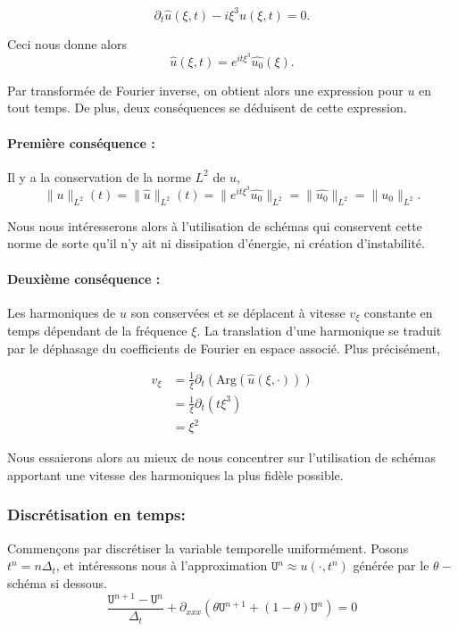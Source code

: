 \documentclass[12pt,a4paper]{article}
\numberwithin{equation}{section}
\begin{document}
\begin{equation*}
    \partial_t\hat{u}(\xi, t) - i\xi^3\hat{u}(\xi, t) = 0.
\end{equation*}

Ceci nous donne alors
\begin{equation*}
    \hat{u}(\xi, t) = e^{it\xi^3}\hat{u_0}(\xi).
\end{equation*}

Par transformée de Fourier inverse, on obtient alors une expression pour $u$ en tout temps. De plus, deux conséquences se déduisent de cette expression.
\paragraph{Première conséquence :} Il y a la conservation de la norme $L^2$ de $u$,
\begin{equation}
    \|u\|_{L^2}(t) = \|\hat{u}\|_{L^2}(t) =\|e^{it\xi^3}\hat{u_0}\|_{L^2} =  \|\hat{u_0}\|_{L^2} =  \|u_0\|_{L^2} .
\end{equation}

Nous nous intéresserons alors à l'utilisation de schémas qui conservent cette norme de sorte qu'il n'y ait ni dissipation d'énergie, ni création d'instabilité.

\paragraph{Deuxième conséquence :} Les harmoniques de $u$ son conservées et se déplacent à vitesse $v_\xi$ constante en temps dépendant de la fréquence $\xi$. La translation d'une harmonique se traduit par le déphasage du coefficients de Fourier en espace associé. Plus précisément, 

\begin{equation}
\begin{split}
    v_\xi &= \frac{1}{\xi}\partial_t (\text{Arg}(\hat{u}(\xi,\cdot)))
    \\ &= \frac{1}{\xi}\partial_t (t\xi^3) 
    \\ &= \xi^2
\end{split}
\end{equation}

Nous essaierons alors au mieux de nous concentrer sur l'utilisation de schémas apportant une vitesse des harmoniques la plus fidèle possible.

\subsubsection{ Discrétisation en temps: }
Commençons par discrétiser la variable temporelle uniformément. Posons $t^n = n\Delta_t$, et intéressons nous à l'approximation $\texttt{U}^n \approx u(\cdot,t^n)$ générée par le $\theta-$schéma si dessous.
\begin{equation}
\frac{\texttt{U}^{n+1}-\texttt{U}^n}{\Delta_t} + \partial_{xxx}(\theta\texttt{U}^{n+1} + (1-\theta)\texttt{U}^{n}) = 0 \label{num_theta_scheme_Airy}
\end{equation}
\end{document}

